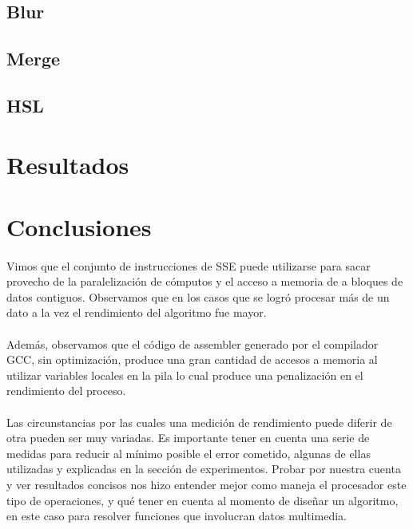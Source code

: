 \documentclass[a4paper]{article}
\begin{document}
\subsection{Blur}



\newpage

\subsection{Merge}



\newpage

\subsection{HSL}



\newpage

\section{Resultados}



\newpage

\section{Conclusiones}

\paragraph{} Vimos que el conjunto de instrucciones de SSE puede utilizarse para sacar provecho de la paralelización de cómputos y el acceso a memoria de a bloques de datos contiguos. Observamos que en los casos que se logró procesar más de un dato a la vez el rendimiento del algoritmo fue mayor.

\paragraph{} Además, observamos que el código de assembler generado por el compilador GCC, sin optimización, produce una gran cantidad de accesos a memoria al utilizar variables locales en la pila lo cual produce una penalización en el rendimiento del proceso. 

\paragraph{} Las circunstancias por las cuales una medición de rendimiento puede diferir de otra pueden ser muy variadas. Es importante tener en cuenta una serie de medidas para reducir al mínimo posible el error cometido, algunas de ellas utilizadas y explicadas en la sección de experimentos. Probar por nuestra cuenta y ver resultados concisos nos hizo entender mejor como maneja el procesador este tipo de operaciones, y qué tener en cuenta al momento de diseñar un algoritmo, en este caso para resolver funciones que involucran datos multimedia.
\end{document}
